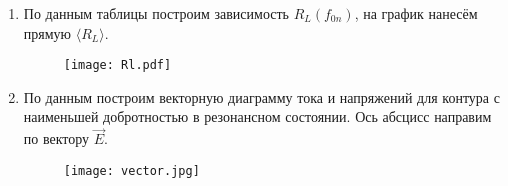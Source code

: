 \documentclass[a4paper,12pt]{extreport}
\begin{document}
\begin{enumerate}
\begin{center}
\end{center}
\item По данным таблицы построим зависимость $R_L(f_{0n})$, на график нанесём прямую $\langle R_L \rangle$.
\begin{center}
	\begin{figure}[ht!]
		\centering
		\texttt{[image: Rl.pdf]}
		\label{C}
	\end{figure}
	 
\end{center}
\item По данным построим векторную диаграмму тока
и напряжений для контура с наименьшей добротностью в резонансном состоянии. Ось
абсцисс направим по вектору $\vec{E}$.
\begin{center}
	\begin{figure}[ht!]
		\centering
		\texttt{[image: vector.jpg]}
		\label{C}
	\end{figure}
	 
\end{center}
\end{enumerate}
\end{document}
